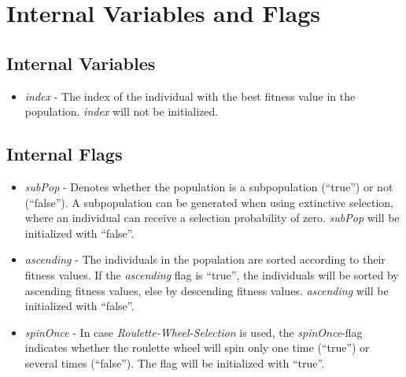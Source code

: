 \section{Internal Variables and Flags}

\subsection{Internal Variables}

\begin{itemize}

\item {\em index} -
The index of the individual with the best fitness value in the
population. {\em index} will not be initialized.

\end{itemize}

\subsection{Internal Flags}

\begin{itemize}

\item {\em subPop} -
Denotes whether the population is a subpopulation (``true'') or
not (``false''). A subpopulation can be generated when using
extinctive selection, where an individual can receive a
selection probability of zero. {\em subPop} will be initialized
with ``false''.

\item {\em ascending} -
The individuals in the population are sorted according
to their fitness values. If the {\em ascending} flag is ``true'', the
individuals will be sorted by ascending fitness values, else by 
descending fitness values.
{\em ascending} will be initialized with ``false''.

\item {\em spinOnce} -
In case {\em Roulette-Wheel-Selection} is 
used, the {\em spinOnce}-flag indicates whether the roulette
wheel will spin only one time (``true'') or several times
(``false''). The flag will be initialized with ``true''.
\end{itemize}
